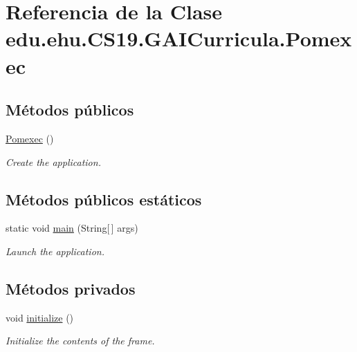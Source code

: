 \hypertarget{classedu_1_1ehu_1_1_c_s19_1_1_g_a_i_curricula_1_1_pomexec}{}\section{Referencia de la Clase edu.\+ehu.\+C\+S19.\+G\+A\+I\+Curricula.\+Pomexec}
\label{classedu_1_1ehu_1_1_c_s19_1_1_g_a_i_curricula_1_1_pomexec}
\subsection*{Métodos públicos}
\begin{DoxyCompactItemize}
\item 
\mbox{\hyperlink{classedu_1_1ehu_1_1_c_s19_1_1_g_a_i_curricula_1_1_pomexec_a8de2bd06d0893d4f24ef2bd8216467cf}{Pomexec}} ()
\begin{DoxyCompactList}\small\item\em Create the application. \end{DoxyCompactList}\end{DoxyCompactItemize}
\subsection*{Métodos públicos estáticos}
\begin{DoxyCompactItemize}
\item 
static void \mbox{\hyperlink{classedu_1_1ehu_1_1_c_s19_1_1_g_a_i_curricula_1_1_pomexec_a52ecabe81c9c3180cdccb3749b6553d6}{main}} (String\mbox{[}$\,$\mbox{]} args)
\begin{DoxyCompactList}\small\item\em Launch the application. \end{DoxyCompactList}\end{DoxyCompactItemize}
\subsection*{Métodos privados}
\begin{DoxyCompactItemize}
\item 
void \mbox{\hyperlink{classedu_1_1ehu_1_1_c_s19_1_1_g_a_i_curricula_1_1_pomexec_ab89003495509c2f11da18c9675828571}{initialize}} ()
\begin{DoxyCompactList}\small\item\em Initialize the contents of the frame. \end{DoxyCompactList}\end{DoxyCompactItemize}
